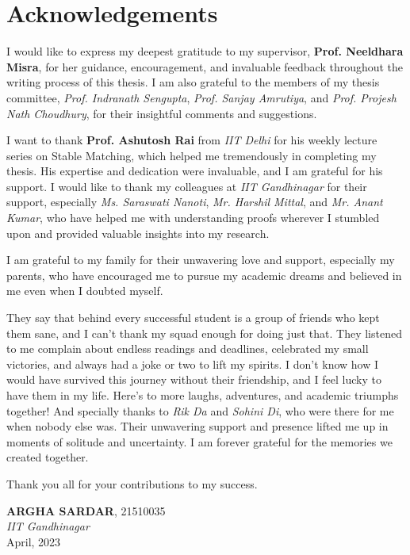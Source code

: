 \chapter{Acknowledgements}

I would like to express my deepest gratitude to my supervisor, \textbf{Prof. Neeldhara Misra}, for her guidance, encouragement, and invaluable feedback throughout the writing process of this thesis. I am also grateful to the members of my thesis committee, \textit{Prof. Indranath Sengupta}, \textit{Prof. Sanjay Amrutiya}, and \textit{Prof. Projesh Nath Choudhury}, for their insightful comments and suggestions.

I want to thank \textbf{Prof. Ashutosh Rai} from \textit{IIT Delhi} for his weekly lecture series on Stable Matching, which helped me tremendously in completing my thesis. His expertise and dedication were invaluable, and I am grateful for his support.
I would like to thank my colleagues at \textit{IIT Gandhinagar} for their support, especially \textit{Ms. Saraswati Nanoti}, \textit{Mr. Harshil Mittal}, and \textit{Mr. Anant Kumar}, who have helped me with understanding proofs wherever I stumbled upon and provided valuable insights into my research.

I am grateful to my family for their unwavering love and support, especially my parents, who have encouraged me to pursue my academic dreams and believed in me even when I doubted myself.

They say that behind every successful student is a group of friends who kept them sane, and I can't thank my squad enough for doing just that. They listened to me complain about endless readings and deadlines, celebrated my small victories, and always had a joke or two to lift my spirits. I don't know how I would have survived this journey without their friendship, and I feel lucky to have them in my life. Here's to more laughs, adventures, and academic triumphs together! And specially thanks to \textit{Rik Da} and \textit{Sohini Di}, who were there for me when nobody else was. Their unwavering support and presence lifted me up in moments of solitude and uncertainty. I am forever grateful for the memories we created together.
\newline

Thank you all for your contributions to my success.
\bigskip

\begin{flushright}   \textbf{ARGHA SARDAR}, 21510035 \\ \textit{IIT Gandhinagar} \\ April, 2023 \end{flushright}
